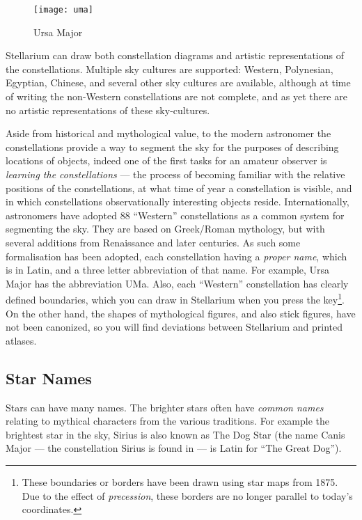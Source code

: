 \begin{figure}[h]
\centering\texttt{[image: uma]}
\caption{Ursa Major}
\label{fig:ursamajor}
\end{figure}


Stellarium can draw both constellation diagrams and artistic
representations of the constellations. Multiple sky cultures are
supported: Western, Polynesian, Egyptian, Chinese, and several other sky cultures are
available, although at time of writing the non-Western constellations
are not complete, and as yet there are no artistic representations of
these sky-cultures.

Aside from historical and mythological value, to the modern astronomer
the constellations provide a way to segment the sky for the purposes
of describing locations of objects, indeed one of the first tasks for
an amateur observer is \emph{learning the constellations} --- the
process of becoming familiar with the relative positions of the
constellations, at what time of year a constellation is visible, and
in which constellations observationally interesting objects reside.
Internationally, astronomers have adopted 88 ``Western''
constellations as a common system for segmenting the sky. They are
based on Greek/Roman mythology, but with several additions from
Renaissance and later centuries.  As such some formalisation has been
adopted, each constellation having a \emph{proper name}, which is in
Latin, and a three letter abbreviation of that name.  For example,
Ursa Major has the abbreviation UMa. Also, each ``Western''
constellation has clearly defined boundaries, which you can draw in
Stellarium when you press the  key\footnote{These boundaries or
  borders have been drawn using star maps from 1875. Due to the effect
  of \emph{precession}, these borders are no longer parallel to
  today's coordinates.}. On the other hand, the shapes of mythological
figures, and also stick figures, have not been canonized, so you will
find deviations between Stellarium and printed atlases.

\subsection{Star Names}
\label{sec:Phenomena:StarNames}

Stars can have many names. The brighter stars often have \emph{common
names} relating to mythical characters from the various traditions. For
example the brightest star in the sky, Sirius is also known as The Dog
Star (the name Canis Major --- the constellation Sirius is found in ---
is Latin for ``The Great Dog''). 

